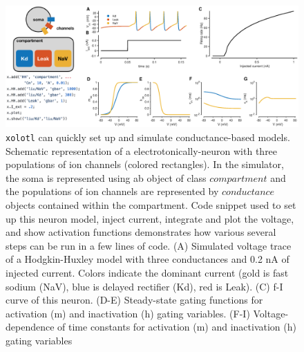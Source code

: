 \documentclass{frontiersSCNS} %
\begin{document}
\begin{figure}
	\centering
	\includegraphics[width=1.0\linewidth]{gfx/figure_HH}
	\caption{\texttt{xolotl} can quickly set up and simulate conductance-based models. Schematic representation of a electrotonically-neuron with three populations of ion channels (colored rectangles). In the simulator, the soma is represented using ab object of class $compartment$ and the populations of ion channels are represented by $conductance$ objects contained within the compartment. Code snippet used to set up this neuron model, inject current, integrate and plot the voltage, and show activation functions demonstrates how various several steps can be run in a few lines of code. (A) Simulated voltage trace of a Hodgkin-Huxley model with three conductances and 0.2 nA of injected current. Colors indicate the dominant current (gold is fast sodium (NaV), blue is delayed rectifier (Kd), red is Leak). (C) f-I curve of this neuron. (D-E) Steady-state gating functions for activation (m) and inactivation (h) gating variables. (F-I) Voltage-dependence of time constants for activation (m) and inactivation (h) gating variables}
	\label{fig:figurehh}
\end{figure}
\end{document}
